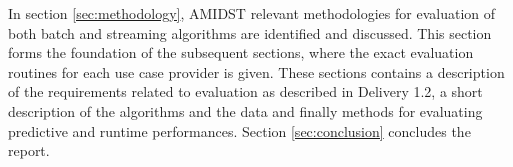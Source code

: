 In section \ref{sec:methodology}, AMIDST relevant methodologies for evaluation of both batch and streaming algorithms are identified and discussed.  This section forms the foundation of the subsequent sections, where the exact evaluation routines for each use case provider is given. These sections contains a description of the requirements related to evaluation as described in Delivery 1.2, a short description of the algorithms and the data and finally methods for evaluating predictive and runtime performances.  Section \ref{sec:conclusion} concludes the report.


%
%
